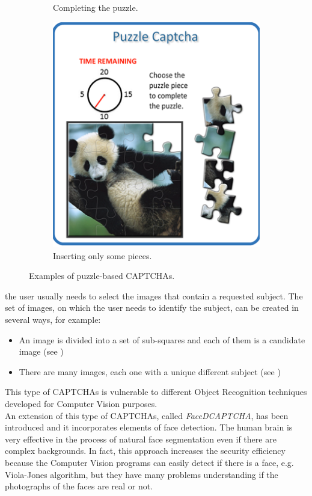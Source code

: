 \begin{itemize}
{\begin{figure}[h]
\begin{subfigure}[b]{0.48\textwidth}
         \caption{\footnotesize{Completing the puzzle.}}
         \label{soa:puzzle}
     \end{subfigure}
     \hfill
     \begin{subfigure}[b]{0.48\textwidth}
         \centering
         \includegraphics[width=.6\linewidth]{Images/StateOfArt/puzzle_CAPTCHA2}
         \caption{\footnotesize{Inserting only some pieces.}}
        \label{soa:puzzle2}
     \end{subfigure}
     \caption{\footnotesize{Examples of puzzle-based CAPTCHAs.}}
\end{figure}
}
{the user usually needs to select the images that contain a requested subject. The set of images, on which the user needs to identify the subject, can be created in several ways, for example:
\begin{itemize}
\item{An image is divided into a set of sub-squares and each of them is a candidate image (see )}
\item{There are many images, each one with a unique different subject (see )}
\end{itemize}
This type of CAPTCHAs is vulnerable to different Object Recognition techniques developed for Computer Vision purposes.\\
An extension of this type of CAPTCHAs, called \textit{FaceDCAPTCHA}, has been introduced\cite{FaceDCAPTCHA} and it incorporates elements of face detection. The human brain is very effective in the process of natural face segmentation even if there are complex backgrounds. In fact, this approach increases the security efficiency because the Computer Vision programs can easily detect if there is a face, e.g. Viola-Jones algorithm\cite{Viola_Jones}, but they have many problems understanding if the photographs of the faces are real or not.\\
}
\end{itemize}
